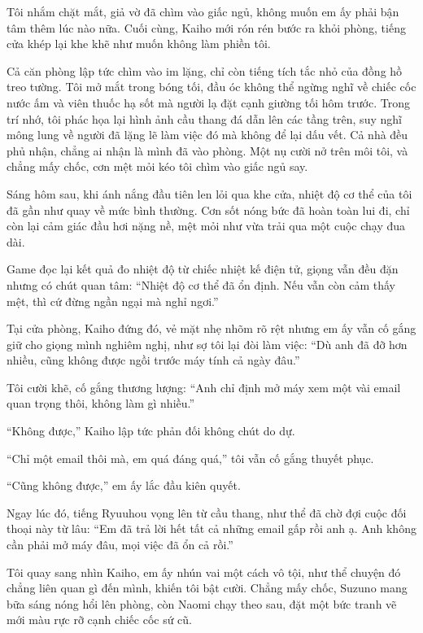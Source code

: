 \documentclass[../main.tex]{subfiles}
\begin{document}
Tôi nhắm chặt mắt, giả vờ đã chìm vào giấc ngủ, không muốn em ấy phải bận tâm thêm lúc nào nữa. Cuối cùng, Kaiho mới rón rén bước ra khỏi phòng, tiếng cửa khép lại khe khẽ như muốn không làm phiền tôi.

Cả căn phòng lập tức chìm vào im lặng, chỉ còn tiếng tích tắc nhỏ của đồng hồ treo tường. Tôi mở mắt trong bóng tối, đầu óc không thể ngừng nghĩ về chiếc cốc nước ấm và viên thuốc hạ sốt mà người lạ đặt cạnh giường tối hôm trước. Trong trí nhớ, tôi phác họa lại hình ảnh cầu thang đá dẫn lên các tầng trên, suy nghĩ mông lung về người đã lặng lẽ làm việc đó mà không để lại dấu vết. Cả nhà đều phủ nhận, chẳng ai nhận là mình đã vào phòng. Một nụ cười nở trên môi tôi, và chẳng mấy chốc, cơn mệt mỏi kéo tôi chìm vào giấc ngủ say.

\ct

Sáng hôm sau, khi ánh nắng đầu tiên len lỏi qua khe cửa, nhiệt độ cơ thể của tôi đã gần như quay về mức bình thường. Cơn sốt nóng bức đã hoàn toàn lui đi, chỉ còn lại cảm giác đầu hơi nặng nề, mệt mỏi như vừa trải qua một cuộc chạy đua dài.

Game đọc lại kết quả đo nhiệt độ từ chiếc nhiệt kế điện tử, giọng vẫn đều đặn nhưng có chút quan tâm: ``Nhiệt độ cơ thể đã ổn định. Nếu vẫn còn cảm thấy mệt, thì cứ đừng ngần ngại mà nghỉ ngơi.''

Tại cửa phòng, Kaiho đứng đó, vẻ mặt nhẹ nhõm rõ rệt nhưng em ấy vẫn cố gắng giữ cho giọng mình nghiêm nghị, như sợ tôi lại đòi làm việc: ``Dù anh đã đỡ hơn nhiều, cũng không được ngồi trước máy tính cả ngày đâu.''

Tôi cười khẽ, cố gắng thương lượng: ``Anh chỉ định mở máy xem một vài email quan trọng thôi, không làm gì nhiều.''

``Không được,'' Kaiho lập tức phản đối không chút do dự.

``Chỉ một email thôi mà, em quá đáng quá,'' tôi vẫn cố gắng thuyết phục.

``Cũng không được,'' em ấy lắc đầu kiên quyết.

Ngay lúc đó, tiếng Ryuuhou vọng lên từ cầu thang, như thể đã chờ đợi cuộc đối thoại này từ lâu: ``Em đã trả lời hết tất cả những email gấp rồi anh ạ. Anh không cần phải mở máy đâu, mọi việc đã ổn cả rồi.''

Tôi quay sang nhìn Kaiho, em ấy nhún vai một cách vô tội, như thể chuyện đó chẳng liên quan gì đến mình, khiến tôi bật cười. Chẳng mấy chốc, Suzuno mang bữa sáng nóng hổi lên phòng, còn Naomi chạy theo sau, đặt một bức tranh vẽ mới màu rực rỡ cạnh chiếc cốc sứ cũ.
\end{document}
